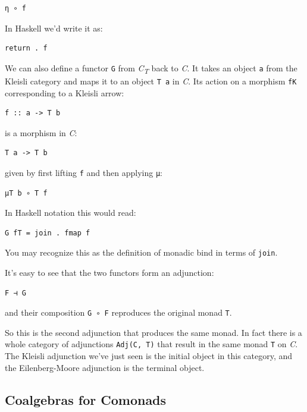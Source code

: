 \begin{verbatim}
η ∘ f
\end{verbatim}

In Haskell we'd write it as:

\begin{verbatim}
return . f
\end{verbatim}

We can also define a functor \texttt{G} from \emph{C\textsubscript{T}}
back to \emph{C}. It takes an object \texttt{a} from the Kleisli
category and maps it to an object \texttt{T\ a} in \emph{C}. Its action
on a morphism \texttt{fK} corresponding to a Kleisli arrow:

\begin{verbatim}
f :: a -> T b
\end{verbatim}

is a morphism in \emph{C}:

\begin{verbatim}
T a -> T b
\end{verbatim}

given by first lifting \texttt{f} and then applying \texttt{μ}:

\begin{verbatim}
μT b ∘ T f
\end{verbatim}

In Haskell notation this would read:

\begin{verbatim}
G fT = join . fmap f
\end{verbatim}

You may recognize this as the definition of monadic bind in terms of
\texttt{join}.

It's easy to see that the two functors form an adjunction:

\begin{verbatim}
F ⊣ G
\end{verbatim}

and their composition \texttt{G\ ∘\ F} reproduces the original monad
\texttt{T}.

So this is the second adjunction that produces the same monad. In fact
there is a whole category of adjunctions \texttt{Adj(C,\ T)} that result
in the same monad \texttt{T} on \emph{C}. The Kleisli adjunction we've
just seen is the initial object in this category, and the
Eilenberg-Moore adjunction is the terminal object.

\subsection{Coalgebras for Comonads}\label{coalgebras-for-comonads}

